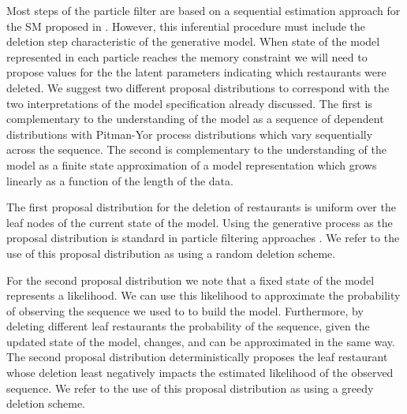 Most steps of the particle filter are based on a sequential estimation approach for the SM proposed in \cite{Gasthaus2010}.  However, this inferential procedure must include the deletion step characteristic of the generative model.  When state of the model represented in each particle reaches the memory constraint we will need to propose values for the the latent parameters indicating which restaurants were deleted. We suggest two different proposal distributions to correspond with the two interpretations of the model specification already discussed.  The first is complementary to the understanding of the model as a sequence of dependent distributions with Pitman-Yor process distributions which vary sequentially across the sequence.  The second is complementary to the understanding of the model as a finite state approximation of a model representation which grows linearly as a function of the length of the data.

The first proposal distribution for the deletion of restaurants is uniform over the leaf nodes of the current state of the model.  Using the generative process as the proposal distribution is standard in particle filtering approaches \cite{Doucet2001}.  We refer to the use of this proposal distribution as using a random deletion scheme.

For the second proposal distribution we note that a fixed state of the model represents a likelihood. We can use this likelihood to approximate the probability of observing the sequence we used to to build the model.  Furthermore, by deleting different leaf restaurants the probability of the sequence, given the updated state of the model, changes, and can be approximated in the same way.  The second proposal distribution deterministically proposes the leaf restaurant whose deletion least negatively impacts the estimated likelihood of the observed sequence.  We refer to the use of this proposal distribution as using a greedy deletion scheme. 



